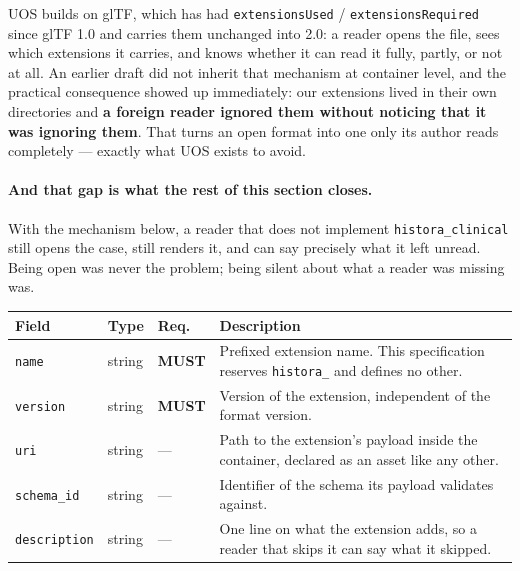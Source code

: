 \documentclass[11pt,a4paper]{article}
\newcommand{\MUST}{\textcolor{uosred}{\textbf{MUST}}}
\newcommand{\code}[1]{\texttt{\small #1}}
\begin{document}
UOS builds on glTF, which has had \code{extensionsUsed} / \code{extensionsRequired} since
glTF 1.0 and carries them unchanged into 2.0: a reader opens the file, sees which extensions it carries, and
knows whether it can read it fully, partly, or not at all. An earlier draft did not
inherit that mechanism at container level, and the practical consequence showed up
immediately: our extensions lived in their own directories and \textbf{a foreign reader
ignored them without noticing that it was ignoring them}. That turns an open format into
one only its author reads completely --- exactly what UOS exists to avoid.

\paragraph{And that gap is what the rest of this section closes.} With the mechanism
below, a reader that does not implement \code{histora\_clinical} still opens the case, still
renders it, and can say precisely what it left unread. Being open was never the problem;
being silent about what a reader was missing was.

\begin{longtable}{L{3.5cm} L{3.0cm} C{1.4cm} L{6.4cm}}
\toprule
\textbf{Field} & \textbf{Type} & \textbf{Req.} & \textbf{Description}\\
\midrule
\endhead
\code{name} & string & \MUST{} & Prefixed extension name. This specification reserves \code{histora\_} and defines no other.\\
\code{version} & string & \MUST{} & Version of the extension, independent of the format version.\\
\code{uri} & string & --- & Path to the extension's payload inside the container, declared as an asset like any other.\\
\code{schema\_id} & string & --- & Identifier of the schema its payload validates against.\\
\code{description} & string & --- & One line on what the extension adds, so a reader that skips it can say what it skipped.\\
\bottomrule
\end{longtable}
\end{document}
